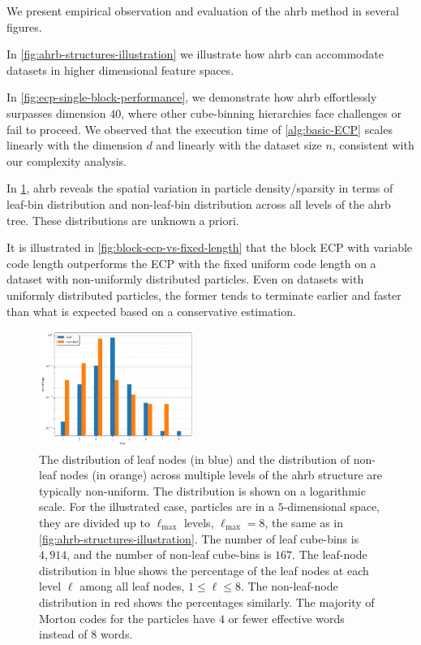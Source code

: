 \documentclass[final]{juliacon}
\begin{document}
We present empirical observation and evaluation of the {\sc ahrb}
method in several figures.
%
\begin{inparaenum}[(a)]
%
\item In \cref{fig:ahrb-structures-illustration} we illustrate how
{\sc ahrb} can accommodate datasets in higher dimensional
feature spaces.
%
\item In \cref{fig:ecp-single-block-performance}, we demonstrate how
  {\sc ahrb} effortlessly surpasses dimension $40$, where other
  cube-binning hierarchies face challenges or fail to proceed. We
  observed that the execution time of \cref{alg:basic-ECP} scales
  linearly with the dimension $d$ and linearly with the dataset size
  $n$, consistent with our complexity analysis.
\item In \cref{fig:node-distributions-on-ahrb}, {\sc ahrb} reveals the
  spatial variation in particle density/sparsity in terms of leaf-bin
  distribution and non-leaf-bin distribution across all levels of the
  {\sc ahrb} tree. These distributions are unknown a priori.
\item It is illustrated in \cref{fig:block-ecp-vs-fixed-length} that the block ECP with
  variable code length outperforms the ECP with the fixed uniform code
  length on a dataset with non-uniformly distributed particles. Even
  on datasets with uniformly distributed particles, the former tends
  to terminate earlier and faster than what is expected based on a
  conservative estimation.
\end{inparaenum}


%
\vspace{6pt}
%
%
%
%
%
\begin{figure}
  \includegraphics[width=0.45\textwidth]{images/tree_hist_boxes}
  \caption{%
    The distribution of leaf nodes (in blue) and the distribution of non-leaf
    nodes (in orange) across multiple levels of the {\sc ahrb} structure are
    typically non-uniform. The distribution is shown on a logarithmic scale. For
    the illustrated case, particles are in a $5$-dimensional space, they are
    divided up to $\ell_{\max}$ levels, $\ell_{\max} = 8$, the same as in
    \cref{fig:ahrb-structures-illustration}.
    The number of leaf cube-bins is $4{,}914$, and 
    the number of non-leaf cube-bins is $167$.
    The leaf-node distribution in blue shows the percentage of the
    leaf nodes at each level $\ell$ among all leaf nodes,
    $1\leq \ell\leq 8$. The non-leaf-node distribution in red
    shows the percentages similarly.
    The majority of Morton codes for the particles
    have $4$ or fewer effective words instead of $8$ words.
  }
  \label{fig:node-distributions-on-ahrb}
\end{figure} %
\end{document}
